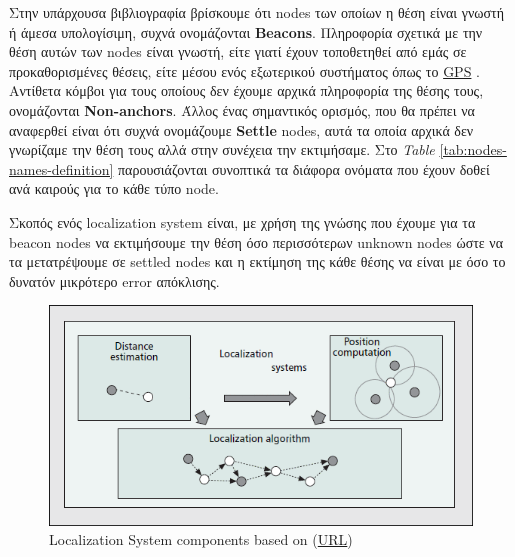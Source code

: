 Στην υπάρχουσα βιβλιογραφία \cite{farooqiazam2016location} \cite{wsn-Localization-systems} \cite{wsn-Localization-techniques} βρίσκουμε ότι
nodes των οποίων η θέση είναι γνωστή ή άμεσα υπολογίσιμη, συχνά ονομάζονται \textbf{Beacons}. Πληροφορία σχετικά με την θέση αυτών
των nodes είναι γνωστή, είτε γιατί έχουν τοποθετηθεί από εμάς σε προκαθορισμένες θέσεις, είτε μέσου ενός εξωτερικού συστήματος
όπως το \hyperref[abbr:GPS]{GPS} \cite{angle-of-arrival}.
Αντίθετα κόμβοι για τους οποίους δεν έχουμε αρχικά πληροφορία της θέσης τους, ονομάζονται \textbf{Non-anchors}.
Άλλος ένας σημαντικός ορισμός, που θα πρέπει να αναφερθεί είναι ότι συχνά ονομάζουμε \textbf{Settle} nodes, 
αυτά τα οποία αρχικά δεν γνωρίζαμε την θέση τους αλλά στην συνέχεια την εκτιμήσαμε.
Στο \emph{Table} \ref{tab:nodes-names-definition} παρουσιάζονται συνοπτικά τα διάφορα ονόματα που έχουν δοθεί ανά 
καιρούς για το κάθε τύπο node.

Σκοπός ενός localization system είναι, με χρήση της γνώσης που έχουμε για τα beacon nodes να εκτιμήσουμε
την θέση όσο περισσότερων unknown nodes ώστε να τα μετατρέψουμε σε settled nodes και η εκτίμηση της κάθε
θέσης να είναι με όσο το δυνατόν μικρότερο error απόκλισης. 

\begin{figure} [H]
	\centering
	\includegraphics[scale=0.5]{Images/Theoretical-Background/localization-systems-components.png}
	\decoRule
	\caption[Localization System components]{Localization System components based on \cite{wsn-Localization-systems} (\href{https://ieeexplore.ieee.org/document/4407221}{URL})}
	\label{fig:Localization-Systems-components}
\end{figure}

